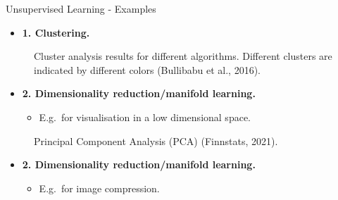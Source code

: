 \begin{vbframe}{Unsupervised Learning - Examples}
  \begin{itemize}
    \item[] \textbf{1. Clustering.}
  \end{itemize}
  \begin{figure}
    \centering
    \caption{Cluster analysis results  for different algorithms. Different clusters are indicated by different colors  (Bullibabu et al., 2016).}
  \end{figure}
\framebreak
  \begin{itemize}
    \item[] \textbf{2. Dimensionality reduction/manifold learning.}
    \ \begin{itemize}
    \item E.g.~for visualisation in a low dimensional space.
    \end{itemize}
  \end{itemize}

    \begin{figure}
        \caption{Principal Component Analysis (PCA) (Finnstats, 2021).}
    \end{figure}

\framebreak
  \begin{itemize}
    \item[] \textbf{2. Dimensionality reduction/manifold learning.}
    \ \begin{itemize}
    \item E.g.~for  image compression.
    \end{itemize}
  \end{itemize}


\end{vbframe}
